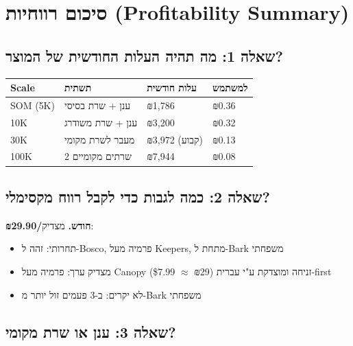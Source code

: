 \documentclass[11pt]{article}
\newcommand{\en}[1]{\textenglish{#1}}
\begin{document}
\section{סיכום רווחיות (\en{Profitability Summary})}

\subsection*{שאלה 1: מה תהיה העלות החודשית של המוצר?}

\begin{longtable}{|>{\raggedright\arraybackslash}p{3.0cm}|>{\raggedright\arraybackslash}p{4.5cm}|>{\raggedright\arraybackslash}p{4.0cm}|>{\raggedright\arraybackslash}p{2.5cm}|}
\hline
\rowcolor{hdr}
\textbf{\en{Scale}} & \textbf{תשתית} & \textbf{עלות חודשית} & \textbf{למשתמש} \\
\hline
\endhead
\en{SOM} (\en{5K}) & ענן + שרת בסיסי & ₪\en{1,786} & ₪\en{0.36} \\ \hline
\rowcolor{ltgray}
\en{10K} & ענן + שרת משודרג & ₪\en{3,200} & ₪\en{0.32} \\ \hline
\en{30K} & מעבר לשרת מקומי & ₪\en{3,972} (קבוע) & ₪\en{0.13} \\ \hline
\rowcolor{ltgray}
\en{100K} & \en{2} שרתים מקומיים & ₪\en{7,944} & ₪\en{0.08} \\ \hline
\end{longtable}

\subsection*{שאלה 2: כמה לגבות כדי לקבל רווח מקסימלי?}

\textbf{₪\en{29.90}/חודש.} מצדיק:
\begin{itemize}[leftmargin=*]
  \item תחרותי: זהה ל-\en{Bosco}, פרמיה מעל \en{Keepers}, מתחת ל-\en{Bark} משפחתי
  \item מצדיק ערך: פרמיה מעל \en{Canopy} (\en{\$7.99} $\approx$ ₪\en{29}) זניחה ומוצדקת ע"י עברית-\en{first}
  \item לא יקרים: ב-\en{3} פעמים זול יותר מ-\en{Bark} משפחתי
\end{itemize}

\subsection*{שאלה 3: ענן או שרת מקומי?}
\end{document}
